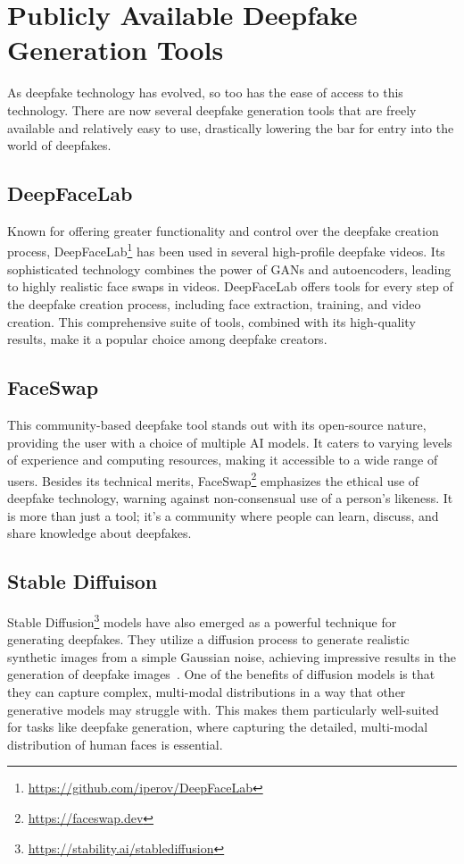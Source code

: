 \section{Publicly Available Deepfake Generation Tools}\label{chapter:publicly}
As deepfake technology has evolved, so too has the ease of access to this technology.
There are now several deepfake generation tools that are freely available and relatively
easy to use, drastically lowering the bar for entry into the world of deepfakes.

\subsection{DeepFaceLab}
Known for offering greater functionality and control over the deepfake creation
process, DeepFaceLab\footnote{\url{https://github.com/iperov/DeepFaceLab}}
has been used in several high-profile deepfake videos.
Its sophisticated technology combines the power of \ac{GAN}s and autoencoders,
leading to highly realistic face swaps in videos. DeepFaceLab offers tools
for every step of the deepfake creation process, including face extraction,
training, and video creation. This comprehensive suite of tools, combined
with its high-quality results, make it a popular choice among deepfake creators.

\subsection{FaceSwap}
This community-based deepfake tool stands out with its open-source nature,
providing the user with a choice of multiple \ac{AI} models. It caters to
varying levels of experience and computing resources, making it accessible
to a wide range of users. Besides its technical merits,
FaceSwap\footnote{\url{https://faceswap.dev}} emphasizes the ethical use
of deepfake technology, warning against non-consensual use of a person's
likeness. It is more than just a tool; it's a community where people can
learn, discuss, and share knowledge about deepfakes.

\subsection{Stable Diffuison}
Stable Diffusion\footnote{\url{https://stability.ai/stablediffusion}} models have
also emerged as a powerful technique for generating deepfakes.
They utilize a diffusion process to generate realistic synthetic images from a
simple Gaussian noise, achieving impressive results in the generation of
deepfake images~\cite{wu2022unifying}. One of the benefits of diffusion models
is that they can capture complex, multi-modal distributions in a way that
other generative models may struggle with. This makes them particularly
well-suited for tasks like deepfake generation, where capturing the
detailed, multi-modal distribution of human faces is essential.

